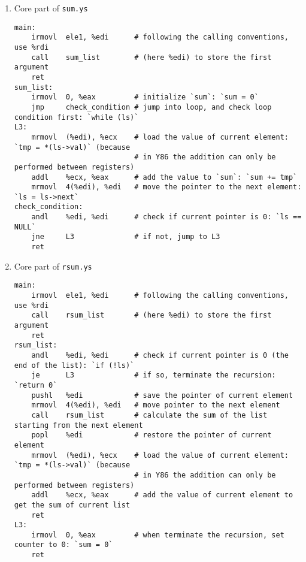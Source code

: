 \documentclass{article}
\begin{document}
\begin{enumerate}
  \item Core part of \verb|sum.ys|
\begin{lstlisting}
main:
    irmovl  ele1, %edi      # following the calling conventions, use %rdi
    call    sum_list        # (here %edi) to store the first argument
    ret
sum_list:
    irmovl  0, %eax         # initialize `sum`: `sum = 0`
    jmp     check_condition # jump into loop, and check loop condition first: `while (ls)`
L3:
    mrmovl  (%edi), %ecx    # load the value of current element: `tmp = *(ls->val)` (because
                            # in Y86 the addition can only be performed between registers)
    addl    %ecx, %eax      # add the value to `sum`: `sum += tmp`
    mrmovl  4(%edi), %edi   # move the pointer to the next element: `ls = ls->next`
check_condition:
    andl    %edi, %edi      # check if current pointer is 0: `ls == NULL`
    jne     L3              # if not, jump to L3
    ret
\end{lstlisting}

  \item Core part of \verb|rsum.ys|
\begin{lstlisting}
main:
    irmovl  ele1, %edi      # following the calling conventions, use %rdi
    call    rsum_list       # (here %edi) to store the first argument
    ret
rsum_list:
    andl    %edi, %edi      # check if current pointer is 0 (the end of the list): `if (!ls)`
    je      L3              # if so, terminate the recursion: `return 0`
    pushl   %edi            # save the pointer of current element
    mrmovl  4(%edi), %edi   # move pointer to the next element
    call    rsum_list       # calculate the sum of the list starting from the next element
    popl    %edi            # restore the pointer of current element
    mrmovl  (%edi), %ecx    # load the value of current element: `tmp = *(ls->val)` (because
                            # in Y86 the addition can only be performed between registers)
    addl    %ecx, %eax      # add the value of current element to get the sum of current list
    ret
L3:
    irmovl  0, %eax         # when terminate the recursion, set counter to 0: `sum = 0`
    ret
\end{lstlisting}


\end{enumerate}
\end{document}
